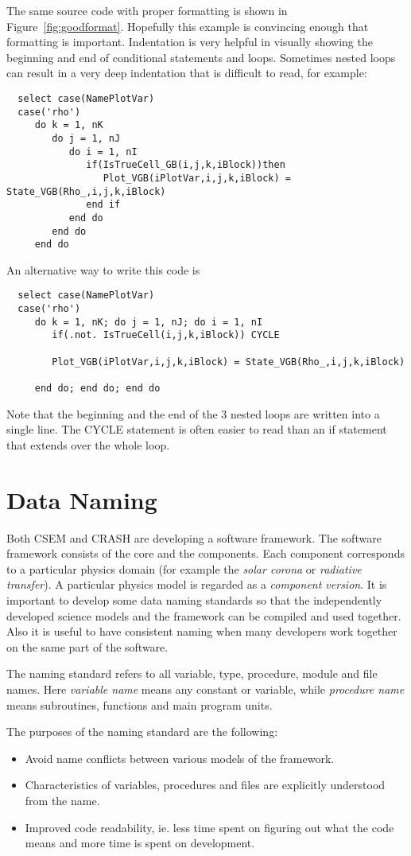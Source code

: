 \documentclass{article}
\begin{document}
The same source code with proper formatting is shown in 
Figure~\ref{fig:goodformat}.
Hopefully this example is convincing enough that formatting is important.
Indentation is very helpful in visually showing the beginning and end of
conditional statements and loops. Sometimes nested loops can result in 
a very deep indentation that is difficult to read, for example:
\begin{verbatim}
  select case(NamePlotVar)
  case('rho')
     do k = 1, nK
        do j = 1, nJ
           do i = 1, nI
              if(IsTrueCell_GB(i,j,k,iBlock))then
                 Plot_VGB(iPlotVar,i,j,k,iBlock) = State_VGB(Rho_,i,j,k,iBlock)
              end if
           end do
        end do
     end do
\end{verbatim}
An alternative way to write this code is
\begin{verbatim}
  select case(NamePlotVar)
  case('rho')
     do k = 1, nK; do j = 1, nJ; do i = 1, nI
        if(.not. IsTrueCell(i,j,k,iBlock)) CYCLE

        Plot_VGB(iPlotVar,i,j,k,iBlock) = State_VGB(Rho_,i,j,k,iBlock)

     end do; end do; end do
\end{verbatim}
Note that the beginning and the end of the 3 nested loops are written into a 
single line. The CYCLE statement is often easier to read than an if statement
that extends over the whole loop. 

\section{Data Naming}

Both CSEM and CRASH are developing a software framework.
The software framework consists of the core and the components.
Each component corresponds to a particular physics domain 
(for example the {\it solar corona} or {\it radiative transfer}). 
A particular physics model is regarded as a {\it component version}.
It is important to develop some data naming
standards so that the independently developed science models 
and the framework can be compiled and used together. Also it is useful
to have consistent naming when many developers work together
on the same part of the software.

The naming standard refers to all variable, type, procedure, module and file 
names. Here {\it variable name} means any constant or variable, while 
{\it procedure name} means subroutines, functions and main program units.

The purposes of the naming standard are the following:
\begin{itemize}
\item Avoid name conflicts between various models of the framework.
\item Characteristics of variables, procedures and files are
      explicitly understood from the name.
\item Improved code readability, ie. less time spent on figuring out 
      what the code means and more time is spent on development.
\end{itemize}
\end{document}

